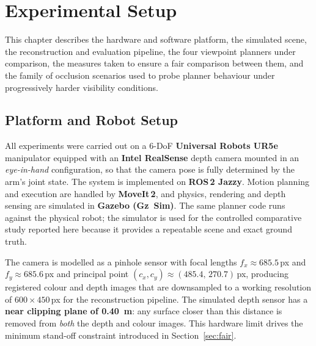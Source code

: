 \chapter{Experimental Setup}
\label{ch:experimental-setup}

This chapter describes the hardware and software platform, the simulated
scene, the reconstruction and evaluation pipeline, the four viewpoint
planners under comparison, the measures taken to ensure a fair comparison
between them, and the family of occlusion scenarios used to probe planner
behaviour under progressively harder visibility conditions.

\section{Platform and Robot Setup}
\label{sec:platform}

All experiments were carried out on a 6-DoF \textbf{Universal Robots UR5e}
manipulator equipped with an \textbf{Intel RealSense} depth camera mounted
in an \emph{eye-in-hand} configuration, so that the camera pose is fully
determined by the arm's joint state. The system is implemented on
\textbf{ROS\,2 Jazzy}. Motion planning and execution are handled by
\textbf{MoveIt\,2}, and physics, rendering and depth sensing are simulated
in \textbf{Gazebo (Gz~Sim)}. The same planner code runs against the
physical robot; the simulator is used for the controlled comparative study
reported here because it provides a repeatable scene and exact ground truth.

The camera is modelled as a pinhole sensor with focal lengths
$f_x\approx 685.5$\,px and $f_y\approx 685.6$\,px and principal point
$(c_x,c_y)\approx(485.4,\,270.7)$\,px, producing registered colour and depth
images that are downsampled to a working resolution of $600\times450$\,px
for the reconstruction pipeline. The simulated depth sensor has a
\textbf{near clipping plane of \SI{0.40}{\meter}}: any surface closer than
this distance is removed from \emph{both} the depth and colour images. This
hardware limit drives the minimum stand-off constraint introduced in
Section~\ref{sec:fair}.

